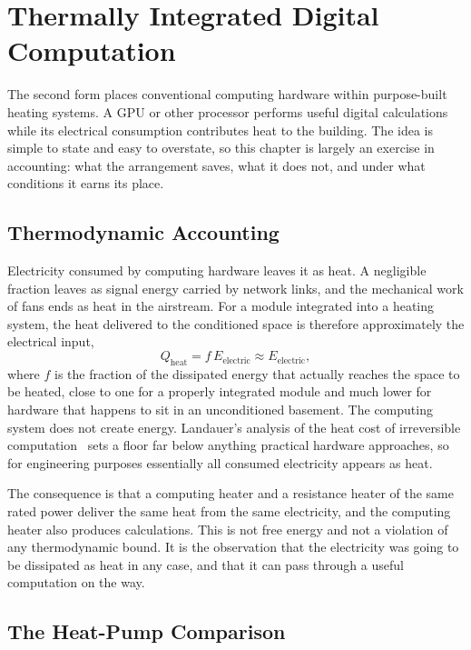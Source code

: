 \chapter{Thermally Integrated Digital Computation}
\label{ch:thermal}

The second form places conventional computing hardware within purpose-built heating systems. A GPU or other processor performs useful digital calculations while its electrical consumption contributes heat to the building. The idea is simple to state and easy to overstate, so this chapter is largely an exercise in accounting: what the arrangement saves, what it does not, and under what conditions it earns its place.

\section{Thermodynamic Accounting}

Electricity consumed by computing hardware leaves it as heat. A negligible fraction leaves as signal energy carried by network links, and the mechanical work of fans ends as heat in the airstream. For a module integrated into a heating system, the heat delivered to the conditioned space is therefore approximately the electrical input,
\[
Q_{\mathrm{heat}}=f\,E_{\mathrm{electric}}\approx E_{\mathrm{electric}},
\]
where $f$ is the fraction of the dissipated energy that actually reaches the space to be heated, close to one for a properly integrated module and much lower for hardware that happens to sit in an unconditioned basement. The computing system does not create energy. Landauer's analysis of the heat cost of irreversible computation~\cite{landauer1961} sets a floor far below anything practical hardware approaches, so for engineering purposes essentially all consumed electricity appears as heat.

The consequence is that a computing heater and a resistance heater of the same rated power deliver the same heat from the same electricity, and the computing heater also produces calculations. This is not free energy and not a violation of any thermodynamic bound. It is the observation that the electricity was going to be dissipated as heat in any case, and that it can pass through a useful computation on the way.

\section{The Heat-Pump Comparison}

